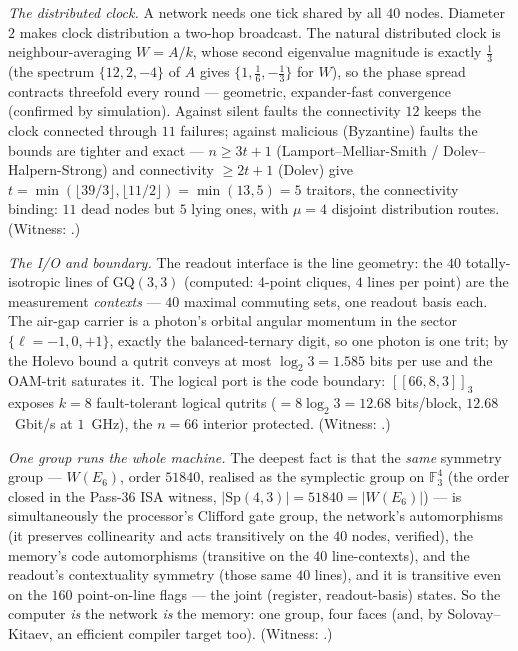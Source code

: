 \documentclass[11pt]{article}
\begin{document}
\emph{The distributed clock.} A network needs one tick shared by all $40$ nodes. Diameter $2$ makes
clock distribution a two-hop broadcast. The natural distributed clock is neighbour-averaging
$W=A/k$, whose second eigenvalue magnitude is exactly $\tfrac13$ (the spectrum $\{12,2,-4\}$ of $A$
gives $\{1,\tfrac16,-\tfrac13\}$ for $W$), so the phase spread contracts threefold every round ---
geometric, expander-fast convergence (confirmed by simulation). Against silent faults the
connectivity $12$ keeps the clock connected through $11$ failures; against malicious (Byzantine)
faults the bounds are tighter and exact --- $n\ge3t+1$ (Lamport--Melliar-Smith / Dolev--Halpern-Strong)
and connectivity $\ge2t+1$ (Dolev) give $t=\min(\lfloor39/3\rfloor,\lfloor11/2\rfloor)=\min(13,5)=5$
traitors, the connectivity binding: $11$ dead nodes but $5$ lying ones, with $\mu=4$ disjoint
distribution routes. (Witness: .)

\emph{The I/O and boundary.} The readout interface is the line geometry: the $40$ totally-isotropic
lines of $\mathrm{GQ}(3,3)$ (computed: $4$-point cliques, $4$ lines per point) are the measurement
\emph{contexts} --- $40$ maximal commuting sets, one readout basis each. The air-gap carrier is a
photon's orbital angular momentum in the sector $\{\ell=-1,0,+1\}$, exactly the balanced-ternary
digit, so one photon is one trit; by the Holevo bound a qutrit conveys at most $\log_2 3=1.585$ bits
per use and the OAM-trit saturates it. The logical port is the code boundary: $[\![66,8,3]\!]_3$
exposes $k=8$ fault-tolerant logical qutrits ($=8\log_2 3=12.68$ bits/block, $12.68$~Gbit/s at
$1$~GHz), the $n=66$ interior protected. (Witness: .)

\emph{One group runs the whole machine.} The deepest fact is that the \emph{same} symmetry group ---
$W(E_6)$, order $51840$, realised as the symplectic group on $\mathbb{F}_3^4$ (the order closed in the
Pass-36 ISA witness, $|\mathrm{Sp}(4,3)|=51840=|W(E_6)|$) --- is simultaneously the processor's
Clifford gate group, the network's automorphisms (it preserves collinearity and acts transitively on
the $40$ nodes, verified), the memory's code automorphisms (transitive on the $40$ line-contexts), and
the readout's contextuality symmetry (those same $40$ lines), and it is transitive even on the $160$
point-on-line flags --- the joint (register, readout-basis) states. So the computer \emph{is} the
network \emph{is} the memory: one group, four faces (and, by Solovay--Kitaev, an efficient compiler
target too). (Witness: .)
\end{document}
